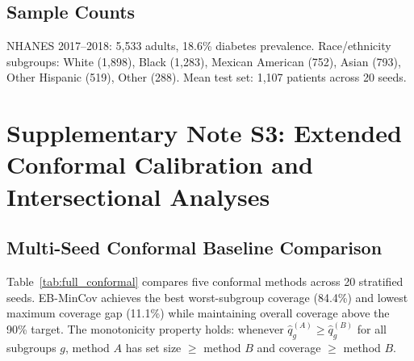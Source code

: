 \documentclass[11pt,a4paper]{article}
\theoremstyle{plain}
\begin{document}
\subsection{Sample Counts}

NHANES 2017--2018: 5,533 adults, 18.6\% diabetes prevalence. Race/ethnicity subgroups: White (1,898), Black (1,283), Mexican American (752), Asian (793), Other Hispanic (519), Other (288). Mean test set: 1,107 patients across 20 seeds.

\section{Supplementary Note S3: Extended Conformal Calibration and Intersectional Analyses}
\label{sec:conformal_ext}

\subsection{Multi-Seed Conformal Baseline Comparison}

Table~\ref{tab:full_conformal} compares five conformal methods across 20 stratified seeds. EB-MinCov achieves the best worst-subgroup coverage (84.4\%) and lowest maximum coverage gap (11.1\%) while maintaining overall coverage above the 90\% target. The monotonicity property holds: whenever $\hat q_g^{(A)} \ge \hat q_g^{(B)}$ for all subgroups $g$, method $A$ has set size $\ge$ method $B$ and coverage $\ge$ method $B$.

\begin{table}[htbp]
\centering
\caption{Multi-seed conformal coverage comparison (20 seeds, Mean $\pm$ 95\% CI).}
\label{tab:full_conformal}
\end{table}
\end{document}
